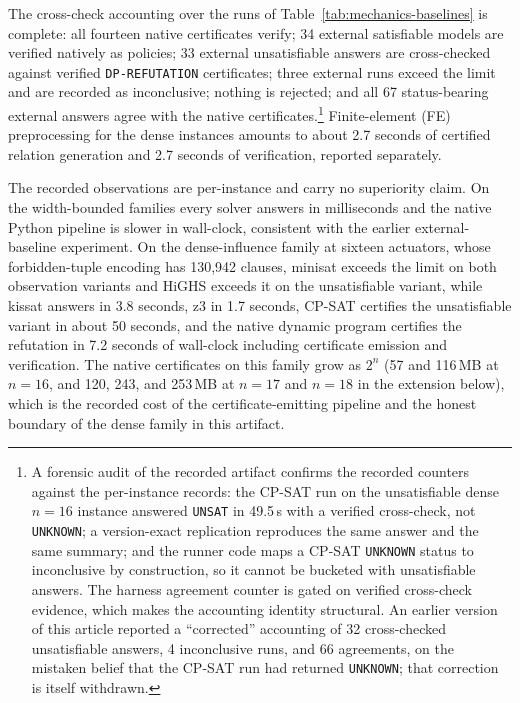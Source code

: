 \documentclass[11pt]{article}
\theoremstyle{plain}
\theoremstyle{definition}
\theoremstyle{remark}
\begin{document}
The cross-check accounting over the runs of
Table~\ref{tab:mechanics-baselines} is complete: all fourteen native certificates
verify; 34 external satisfiable models are verified natively as policies;
33 external unsatisfiable answers are cross-checked against verified
\texttt{DP-REFUTATION} certificates; three external runs exceed the limit
and are recorded as inconclusive; nothing is rejected; and all 67 status-bearing
external answers agree with the native
certificates.\footnote{A forensic audit of the recorded artifact confirms the
recorded counters against the per-instance records: the CP-SAT run on the
unsatisfiable dense \(n{=}16\) instance answered \texttt{UNSAT} in 49.5\,s
with a verified cross-check, not \texttt{UNKNOWN}; a version-exact
replication reproduces the same answer and the same summary; and the
runner code maps a CP-SAT \texttt{UNKNOWN} status to inconclusive by
construction, so it cannot be bucketed with unsatisfiable answers.  The
harness agreement counter is gated on verified cross-check evidence,
which makes the accounting identity structural.  An earlier version of
this article reported a ``corrected'' accounting of 32 cross-checked
unsatisfiable answers, 4 inconclusive runs, and 66 agreements, on the
mistaken belief that the CP-SAT run had returned \texttt{UNKNOWN}; that
correction is itself withdrawn.}
Finite-element (FE) preprocessing for the dense instances amounts to about 2.7 seconds of
certified relation generation and 2.7 seconds of verification, reported
separately.

The recorded observations are per-instance and carry no superiority claim.
On the width-bounded families every solver answers in milliseconds and the
native Python pipeline is slower in wall-clock, consistent with the earlier
external-baseline experiment.  On the dense-influence family at sixteen
actuators, whose forbidden-tuple encoding has 130{,}942 clauses, minisat
exceeds the limit on both observation variants and HiGHS exceeds it on the
unsatisfiable variant, while kissat answers in 3.8 seconds, z3 in 1.7
seconds, CP-SAT certifies the unsatisfiable variant in about 50 seconds,
and the native dynamic program certifies the refutation in 7.2 seconds of
wall-clock including certificate emission and verification.  The
native certificates on this family grow as \(2^{n}\) (57 and 116\,MB at
\(n{=}16\), and 120, 243, and 253\,MB at \(n{=}17\) and \(n{=}18\) in
the extension below), which is the recorded cost of the certificate-emitting
pipeline and the honest boundary of the dense family in this artifact.
\end{document}
